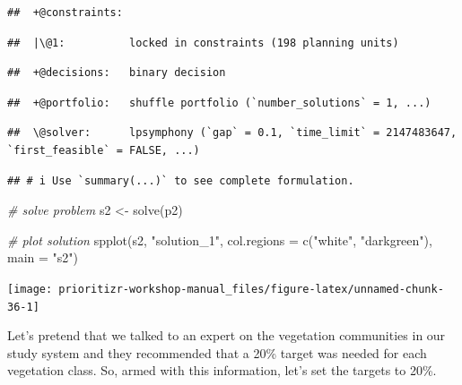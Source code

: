 \documentclass[
  12pt,
]{book}
\newenvironment{Shaded}{\begin{snugshade}}{\end{snugshade}}
\newcommand{\AttributeTok}[1]{\textcolor[rgb]{0.77,0.63,0.00}{#1}}
\newcommand{\CommentTok}[1]{\textcolor[rgb]{0.56,0.35,0.01}{\textit{#1}}}
\newcommand{\FunctionTok}[1]{\textcolor[rgb]{0.00,0.00,0.00}{#1}}
\newcommand{\NormalTok}[1]{#1}
\newcommand{\OtherTok}[1]{\textcolor[rgb]{0.56,0.35,0.01}{#1}}
\newcommand{\StringTok}[1]{\textcolor[rgb]{0.31,0.60,0.02}{#1}}
\begin{document}
\begin{verbatim}
##  +@constraints:
\end{verbatim}

\begin{verbatim}
##  |\@1:          locked in constraints (198 planning units)
\end{verbatim}

\begin{verbatim}
##  +@decisions:   binary decision
\end{verbatim}

\begin{verbatim}
##  +@portfolio:   shuffle portfolio (`number_solutions` = 1, ...)
\end{verbatim}

\begin{verbatim}
##  \@solver:      lpsymphony (`gap` = 0.1, `time_limit` = 2147483647, `first_feasible` = FALSE, ...)
\end{verbatim}

\begin{verbatim}
## # i Use `summary(...)` to see complete formulation.
\end{verbatim}

\begin{Shaded}
\begin{Highlighting}[]
\CommentTok{\# solve problem}
\NormalTok{s2 }\OtherTok{\textless{}{-}} \FunctionTok{solve}\NormalTok{(p2)}

\CommentTok{\# plot solution}
\FunctionTok{spplot}\NormalTok{(s2, }\StringTok{"solution\_1"}\NormalTok{, }\AttributeTok{col.regions =} \FunctionTok{c}\NormalTok{(}\StringTok{"white"}\NormalTok{, }\StringTok{"darkgreen"}\NormalTok{), }\AttributeTok{main =} \StringTok{"s2"}\NormalTok{)}
\end{Highlighting}
\end{Shaded}

\begin{center}\texttt{[image: prioritizr-workshop-manual\_files/figure-latex/unnamed-chunk-36-1]} \end{center}

Let's pretend that we talked to an expert on the vegetation communities in our study system and they recommended that a 20\% target was needed for each vegetation class. So, armed with this information, let's set the targets to 20\%.
\end{document}
